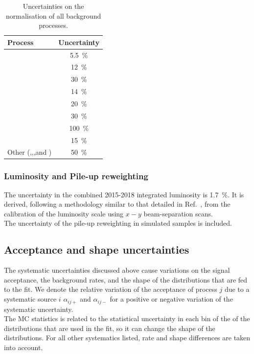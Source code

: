 \begin{table}[t]
	\small
	\centering
	\begin{tabular}{l c }
		\toprule
		\textbf{Process} & Uncertainty \\
		\midrule
		\ttbar & \SI{5.5}{\%} \\
		\ttV    & \SI{12}{\%} \\
		\tWZ & \SI{30}{\%} \\
		\tZq & \SI{14}{\%} \\
		\VVLF & \SI{20}{\%} \\
		\VVHF & \SI{30}{\%} \\
		\Zjets & \SI{100}{\%} \\
		 \ttH    & \SI{15}{\%} \\
		Other (\ttt,\tttt,\VVV,\VH and \ttWW) & \SI{50}{\%} \\		
		\bottomrule
	\end{tabular}
	\caption{Uncertainties on the normalisation of all background processes.}
	\label{tab:syst-crosssections}
\end{table}

\subsubsection{Luminosity and Pile-up reweighting} 
The uncertainty in the combined 2015-2018 integrated luminosity is
\SI{1.7}{\%}. It is derived, following a methodology similar to that
detailed in Ref.~\cite{DAPR-2013-01}, from the calibration of the
luminosity scale using $x-y$ beam-separation scans.\\
The uncertainty of the pile-up reweighting in simulated samples is included.

\subsection {Acceptance and shape uncertainties}
\label{sec:systematic:treatment}

The systematic uncertainties discussed above cause variations on the signal
acceptance, the background rates, and the shape of the distributions
that are fed to the fit.
We denote the relative variation of the acceptance of process $j$
due to a systematic source $i$ $\alpha_{ij+}$ and $\alpha_{ij-}$ for a
positive or negative variation of the systematic uncertainty.		\\
The MC statistics is related to the statistical uncertainty in each
bin of the of the distributions that are used in the fit,
so it can change the shape of the distributions. 
For all other systematics listed, rate and shape differences are taken
into account. 
